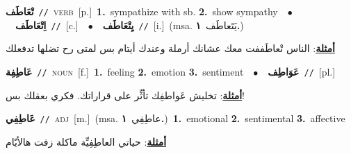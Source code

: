 \documentclass[10pt,a4paper,twoside]{article} %
\begin{document}
\begin{multicols}{2}
{\setlength\topsep{0pt}\textbf{\foreignlanguage{arabic}{تْعَاطَف}}\ {\color{gray}\texttt{//}\color{black}}\ \textsc{verb}\ [p.]\ \textbf{1.}~sympathize with sb.  \textbf{2.}~show sympathy\ \ $\bullet$\ \ \setlength\topsep{0pt}\textbf{\foreignlanguage{arabic}{اِتْعَاطَف}}\ {\color{gray}\texttt{//}\color{black}}\ [c.]\ \ $\bullet$\ \ \setlength\topsep{0pt}\textbf{\foreignlanguage{arabic}{يِتْعَاطَف}}\ {\color{gray}\texttt{//}\color{black}}\ [i.]\ \color{gray}(msa. \foreignlanguage{arabic}{يَتَعاطَف}~\foreignlanguage{arabic}{\textbf{١.}})\color{black}\  \begin{flushright}\color{gray}\foreignlanguage{arabic}{\textbf{\underline{\foreignlanguage{arabic}{أمثلة}}}: الناس تْعاطَففت معك عشانك أرملة وعندك أيتام بس لمتى رح تضلها تدفعلك}\end{flushright}\color{black}} \vspace{2mm}

{\setlength\topsep{0pt}\textbf{\foreignlanguage{arabic}{عَاطِفِة}}\ {\color{gray}\texttt{//}\color{black}}\ \textsc{noun}\ [f.]\ \textbf{1.}~feeling  \textbf{2.}~emotion  \textbf{3.}~sentiment\ \ $\bullet$\ \ \setlength\topsep{0pt}\textbf{\foreignlanguage{arabic}{عَوَاطِف}}\ {\color{gray}\texttt{//}\color{black}}\ [pl.]\  \begin{flushright}\color{gray}\foreignlanguage{arabic}{\textbf{\underline{\foreignlanguage{arabic}{أمثلة}}}: تخليش عَواطفِك تأثِّر على قراراتك. فكري بعقلك بس!}\end{flushright}\color{black}} \vspace{2mm}

{\setlength\topsep{0pt}\textbf{\foreignlanguage{arabic}{عَاطِفِي}}\ {\color{gray}\texttt{//}\color{black}}\ \textsc{adj}\ [m.]\ \color{gray}(msa. \foreignlanguage{arabic}{عاطِفِي}~\foreignlanguage{arabic}{\textbf{١.}})\color{black}\ \textbf{1.}~emotional  \textbf{2.}~sentimental  \textbf{3.}~affective\  \begin{flushright}\color{gray}\foreignlanguage{arabic}{\textbf{\underline{\foreignlanguage{arabic}{أمثلة}}}: حياتي العاطِفِيِّة ماكلة زفت هالأيّام}\end{flushright}\color{black}} \vspace{2mm}


\end{multicols}
\end{document}
